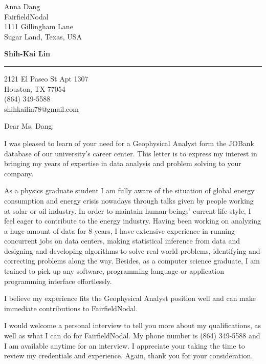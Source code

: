\documentclass{letter} %
\begin{document}
\signature{Shih-Kai Lin}           %
\longindentation=0pt                       %
\let\raggedleft\raggedright                %
 
 
\begin{letter}{Anna Dang \\
FairfieldNodal \\
1111 Gillingham Lane \\
Sugar Land, Texas, USA}

\begin{center}
{\large\bf Shih-Kai Lin} 
\end{center}
\medskip\hrule height 1pt
\begin{center}
{2121 El Paseo St Apt 1307 \\   Houston, TX 77054 \\ (864) 349-5588 \\ shihkailin78@gmail.com} 
\end{center} \vfill %
 
 
\opening{Dear Ms. Dang:} 
 
\noindent 
I was pleased to learn of your need for a Geophysical Analyst form the JOBank database of our university's career center. This letter is to express my interest in bringing my years of expertise in data analysis and problem solving to your company.
 
\noindent 
As a physics graduate student I am fully aware of the situation of global energy consumption and energy crisis nowadays through talks given by people working at solar or oil industry. In order to maintain human beings' current life style, I feel eager to contribute to the energy industry. Having been working on analyzing a huge amount of data for 8 years, I have extensive experience in running concurrent jobs on data centers, making statistical inference from data and designing and developing algorithms to solve real world problems, identifying and correcting problems along the way. Besides, as a computer science graduate, I am trained to pick up any software, programming language or application programming interface effortlessly.

I believe my experience fits the Geophysical Analyst position well and can make immediate contributions to FairfieldNodal.

\noindent %
I would welcome a personal interview to tell you more about my qualifications, as well as what I can do for FairfieldNodal.  My phone number is (864) 349-5588 and I am available anytime for
an interview. I appreciate your taking the time to review my credentials and experience. Again, thank you for your consideration. 
 

\end{letter}
\end{document}
